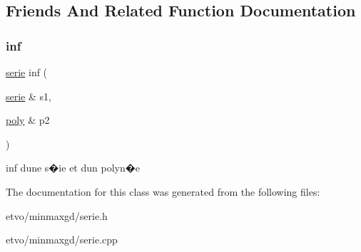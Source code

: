 \subsection{Friends And Related Function Documentation}
\mbox{\label{classmmgd_1_1serie_ae529c9c97ff0829cde0be6b234952d67}} 
\subsubsection{\texorpdfstring{inf}{inf}}
{\footnotesize\ttfamily \mbox{\hyperlink{classmmgd_1_1serie}{serie}} inf (\begin{DoxyParamCaption}\item[{\mbox{\hyperlink{classmmgd_1_1serie}{serie}} \&}]{s1,  }\item[{\mbox{\hyperlink{classmmgd_1_1poly}{poly}} \&}]{p2 }\end{DoxyParamCaption})\hspace{0.3cm}{\ttfamily [friend]}}

inf d\textquotesingle{}une s�ie et d\textquotesingle{}un polyn�e 

The documentation for this class was generated from the following files\+:\begin{DoxyCompactItemize}
\item 
etvo/minmaxgd/serie.\+h\item 
etvo/minmaxgd/serie.\+cpp\end{DoxyCompactItemize}
